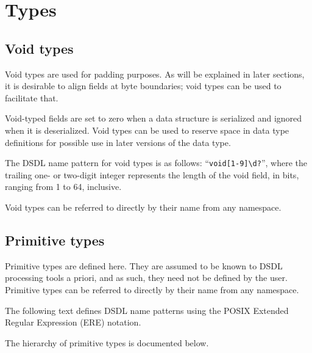 \section{Types}

\subsection{Void types}

Void types are used for padding purposes.
As will be explained in later sections, it is desirable to align fields at byte boundaries;
void types can be used to facilitate that.

Void-typed fields are set to zero when a data structure is serialized and ignored when it is deserialized.
Void types can be used to reserve space in data type definitions for possible use in later versions of the data type.

The DSDL name pattern for void types is as follows: ``\verb|void[1-9]\d?|'',
where the trailing one- or two-digit integer represents the length of the void field, in bits,
ranging from 1 to 64, inclusive.

Void types can be referred to directly by their name from any namespace.

\subsection{Primitive types}

Primitive types are defined here. They are assumed to be known to DSDL processing tools a priori,
and as such, they need not be defined by the user.
Primitive types can be referred to directly by their name from any namespace.

The following text defines DSDL name patterns using the POSIX Extended Regular Expression (ERE) notation.

The hierarchy of primitive types is documented below.

